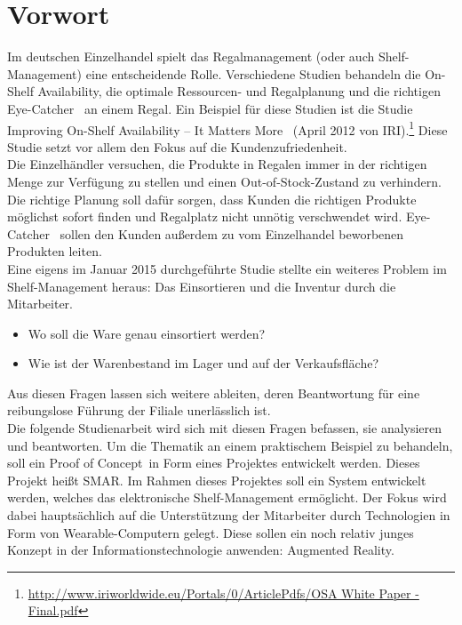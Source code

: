 \chapter{Vorwort}
\label{cha:vorwort}
Im deutschen Einzelhandel spielt das Regalmanagement (oder auch Shelf-Management) eine entscheidende Rolle. Verschiedene Studien behandeln die \glqq On-Shelf Availability\grqq , die optimale Ressourcen- und Regalplanung und die richtigen \glqq Eye-Catcher\grqq~ an einem Regal. Ein Beispiel für diese Studien ist \zB die Studie \glqq Improving On-Shelf Availability -- It Matters More\grqq~ (April 2012 von IRI).\footnote{\url{http://www.iriworldwide.eu/Portals/0/ArticlePdfs/OSA White Paper - Final.pdf}} Diese Studie setzt vor allem den Fokus auf die Kundenzufriedenheit.\\

Die Einzelhändler versuchen, die Produkte in Regalen immer in der richtigen Menge zur Verfügung zu stellen und einen \glqq Out-of-Stock\grqq -Zustand zu verhindern. Die richtige Planung soll dafür sorgen, dass Kunden die richtigen Produkte möglichst sofort finden und Regalplatz nicht unnötig verschwendet wird. \glqq Eye-Catcher\grqq~ sollen den Kunden außerdem zu vom Einzelhandel beworbenen Produkten leiten.\\

Eine eigens im Januar 2015 durchgeführte Studie stellte ein weiteres Problem im Shelf-Management heraus: Das Einsortieren und die Inventur durch die Mitarbeiter.
\begin{itemize}
	\item Wo soll die Ware genau einsortiert werden?
	\item Wie ist der Warenbestand im Lager und auf der Verkaufsfläche?
\end{itemize}
Aus diesen Fragen lassen sich weitere ableiten, deren Beantwortung für eine reibungslose Führung der Filiale unerlässlich ist.\\

Die folgende Studienarbeit wird sich mit diesen Fragen befassen, sie analysieren und beantworten. Um die Thematik an einem praktischem Beispiel zu behandeln, soll ein \glqq Proof of Concept\grqq~in Form eines Projektes entwickelt werden. Dieses Projekt heißt \ac{SMAR}. Im Rahmen dieses Projektes soll ein System entwickelt werden, welches das elektronische Shelf-Management ermöglicht. Der Fokus wird dabei hauptsächlich auf die Unterstützung der Mitarbeiter durch Technologien in Form von Wearable-Computern gelegt. Diese sollen ein noch relativ junges Konzept in der Informationstechnologie anwenden: Augmented Reality.

